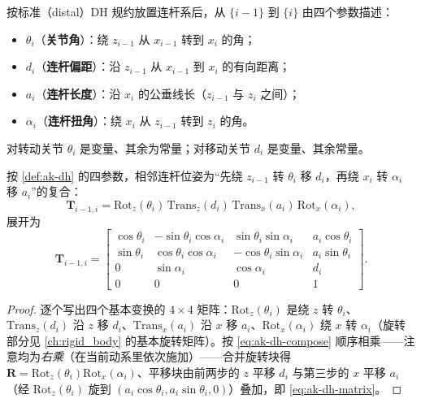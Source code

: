 \begin{definition}\label{def:ak-dh}
按标准（distal）DH 规约放置连杆系后，从 $\{i-1\}$ 到 $\{i\}$ 由四个参数描述\cite{spong2006robot}：
\begin{itemize}
  \item $\theta_i$（\textbf{关节角}）：绕 $z_{i-1}$ 从 $x_{i-1}$ 转到 $x_i$ 的角；
  \item $d_i$（\textbf{连杆偏距}）：沿 $z_{i-1}$ 从 $x_{i-1}$ 到 $x_i$ 的有向距离；
  \item $a_i$（\textbf{连杆长度}）：沿 $x_i$ 的公垂线长（$z_{i-1}$ 与 $z_i$ 之间）；
  \item $\alpha_i$（\textbf{连杆扭角}）：绕 $x_i$ 从 $z_{i-1}$ 转到 $z_i$ 的角。
\end{itemize}
对转动关节 $\theta_i$ 是变量、其余为常量；对移动关节 $d_i$ 是变量、其余常量。
\end{definition}

\begin{theorem}[标准 DH 变换矩阵]\label{thm:ak-dh-matrix}
按 \cref{def:ak-dh} 的四参数，相邻连杆位姿为“先绕 $z_{i-1}$ 转 $\theta_i$ 移 $d_i$，再绕 $x_i$ 转 $\alpha_i$ 移 $a_i$”的复合\cite{spong2006robot}：
\begin{equation}
  \mathbf{T}_{i-1,i}=\mathrm{Rot}_z(\theta_i)\,\mathrm{Trans}_z(d_i)\,\mathrm{Trans}_x(a_i)\,\mathrm{Rot}_x(\alpha_i),
  \label{eq:ak-dh-compose}
\end{equation}
展开为
\begin{equation}
  \boxed{\mathbf{T}_{i-1,i}=
  \begin{bmatrix}
    \cos\theta_i & -\sin\theta_i\cos\alpha_i & \sin\theta_i\sin\alpha_i & a_i\cos\theta_i\\
    \sin\theta_i & \cos\theta_i\cos\alpha_i & -\cos\theta_i\sin\alpha_i & a_i\sin\theta_i\\
    0 & \sin\alpha_i & \cos\alpha_i & d_i\\
    0 & 0 & 0 & 1
  \end{bmatrix}.}
  \label{eq:ak-dh-matrix}
\end{equation}
\end{theorem}
\begin{proof}
逐个写出四个基本变换的 $4\times4$ 矩阵：$\mathrm{Rot}_z(\theta_i)$ 是绕 $z$ 转 $\theta_i$、$\mathrm{Trans}_z(d_i)$ 沿 $z$ 移 $d_i$、$\mathrm{Trans}_x(a_i)$ 沿 $x$ 移 $a_i$、$\mathrm{Rot}_x(\alpha_i)$ 绕 $x$ 转 $\alpha_i$（旋转部分见 \cref{ch:rigid_body} 的基本旋转矩阵）。按 \cref{eq:ak-dh-compose} 顺序相乘——注意均为\emph{右乘}（在当前动系里依次施加）——合并旋转块得 $\mathbf{R}=\mathrm{Rot}_z(\theta_i)\mathrm{Rot}_x(\alpha_i)$、平移块由前两步的 $z$ 平移 $d_i$ 与第三步的 $x$ 平移 $a_i$（经 $\mathrm{Rot}_z(\theta_i)$ 旋到 $(a_i\cos\theta_i,a_i\sin\theta_i,0)$）叠加，即 \cref{eq:ak-dh-matrix}。
\end{proof}

